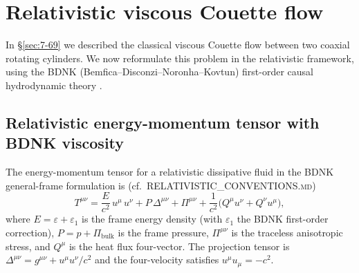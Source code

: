 
\section{Relativistic viscous Couette flow}\label{sec:rel-7-69}

In \S\ref{sec:7-69} we described the classical viscous Couette flow
between two coaxial rotating cylinders.  We now reformulate this
problem in the relativistic framework, using the BDNK
(Bemfica--Disconzi--Noronha--Kovtun) first-order causal
hydrodynamic theory \citep{BemficaDN2018,Kovtun2019,BemficaDN2019,HoultKovtun2020}.

\subsection{Relativistic energy-momentum tensor with BDNK
  viscosity}\label{sec:rel-7-69a}

The energy-momentum tensor for a relativistic dissipative fluid in
the BDNK general-frame formulation is
(cf.\ \textsc{RELATIVISTIC\_CONVENTIONS.md})
\begin{equation}
\label{eq:rel-7-134}
T^{\mu\nu} = \frac{E}{c^{2}}\,u^{\mu}\,u^{\nu}
  + P\,\Delta^{\mu\nu}
  + \Pi^{\mu\nu}
  + \frac{1}{c^{2}}\bigl(Q^{\mu}u^{\nu}+Q^{\nu}u^{\mu}\bigr),
\end{equation}
where $E = \varepsilon + \varepsilon_{1}$ is the frame energy density
(with $\varepsilon_{1}$ the BDNK first-order correction),
$P = p + \Pi_{\mathrm{bulk}}$ is the frame pressure,
$\Pi^{\mu\nu}$ is the traceless anisotropic stress, and
$Q^{\mu}$ is the heat flux four-vector.  The
projection tensor is
$\Delta^{\mu\nu}=g^{\mu\nu}+u^{\mu}u^{\nu}/c^{2}$ and the
four-velocity satisfies $u^{\mu}u_{\mu}=-c^{2}$.

